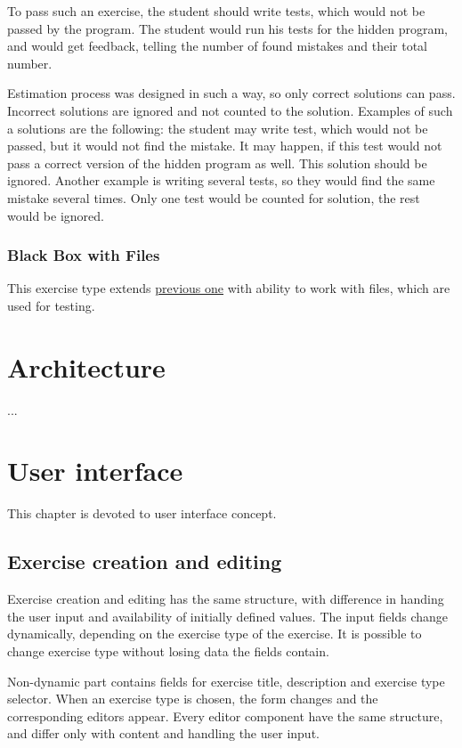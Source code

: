             To pass such an exercise, the student should write tests, which would not be passed by the program. The student would run his tests for the hidden program, and would get feedback, telling the number of found mistakes and their total number.
            
            Estimation process was designed in such a way, so only correct solutions can pass. Incorrect solutions are ignored and not counted to the solution. Examples of such a solutions are the following: the student may write test, which would not be passed, but it would not find the mistake. It may happen, if this test would not pass a correct version of the hidden program as well. This solution should be ignored. Another example is writing several tests, so they would find the same mistake several times. Only one test would be counted for solution, the rest would be ignored.
            
            
            \subsubsection{Black Box with Files}
            This exercise type extends \hyperref[subsubsec:blackbox]{previous one} with ability to work with files, which are used for testing.


\section{Architecture}

...

\section{User interface}
This chapter is devoted to user interface concept.
    
    \subsection{Exercise creation and editing}
    Exercise creation and editing has the same structure, with difference in handing the user input and availability of initially defined values. The input fields change dynamically, depending on the exercise type of the exercise. It is possible to change exercise type without losing data the fields contain.
    
    Non-dynamic part contains fields for exercise title, description and exercise type selector. When an exercise type is chosen, the form changes and the corresponding editors appear. Every editor component have the same structure, and differ only with content and handling the user input.
    
